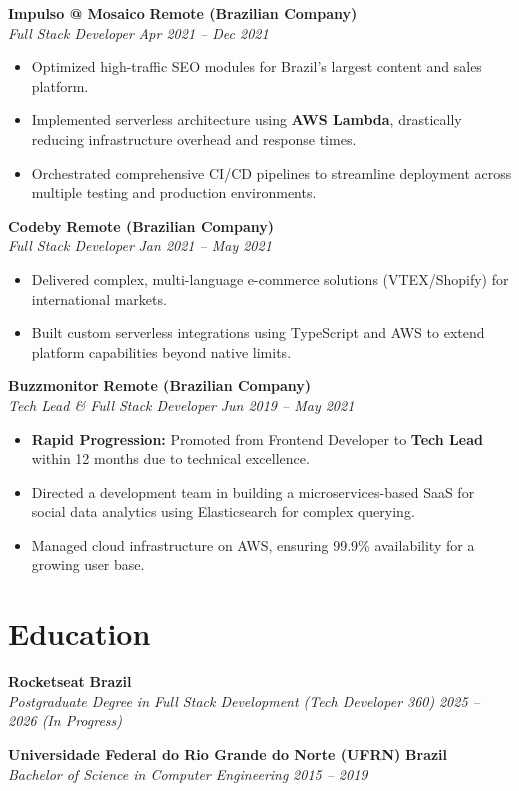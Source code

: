 \documentclass[a4paper,10pt]{article}
\newcommand{\experience}[4]{
    \noindent
    \textbf{\large #1} \hfill \textbf{#2} \\
    \textit{\color{darkgray} #3} \hfill \textit{#4}
    \vspace{2pt}
}
\begin{document}
\vspace{0.3cm}

\experience{Impulso @ Mosaico}{Remote (Brazilian Company)}{Full Stack Developer}{Apr 2021 -- Dec 2021}
\begin{itemize}[leftmargin=*, noitemsep, topsep=2pt]
    \item Optimized high-traffic SEO modules for Brazil's largest content and sales platform.
    \item Implemented serverless architecture using \textbf{AWS Lambda}, drastically reducing infrastructure overhead and response times.
    \item Orchestrated comprehensive CI/CD pipelines to streamline deployment across multiple testing and production environments.
\end{itemize}

\vspace{0.3cm}

\experience{Codeby}{Remote (Brazilian Company)}{Full Stack Developer}{Jan 2021 -- May 2021}
\begin{itemize}[leftmargin=*, noitemsep, topsep=2pt]
    \item Delivered complex, multi-language e-commerce solutions (VTEX/Shopify) for international markets.
    \item Built custom serverless integrations using TypeScript and AWS to extend platform capabilities beyond native limits.
\end{itemize}

\vspace{0.3cm}

\experience{Buzzmonitor}{Remote (Brazilian Company)}{Tech Lead \& Full Stack Developer}{Jun 2019 -- May 2021}
\begin{itemize}[leftmargin=*, noitemsep, topsep=2pt]
    \item \textbf{Rapid Progression:} Promoted from Frontend Developer to \textbf{Tech Lead} within 12 months due to technical excellence.
    \item Directed a development team in building a microservices-based SaaS for social data analytics using Elasticsearch for complex querying.
    \item Managed cloud infrastructure on AWS, ensuring 99.9\% availability for a growing user base.
\end{itemize}

\section{Education}

\experience{Rocketseat}{Brazil}{Postgraduate Degree in Full Stack Development (Tech Developer 360)}{2025 -- 2026 (In Progress)}
\vspace{0.1cm}

\experience{Universidade Federal do Rio Grande do Norte (UFRN)}{Brazil}{Bachelor of Science in Computer Engineering}{2015 -- 2019}
\end{document}
